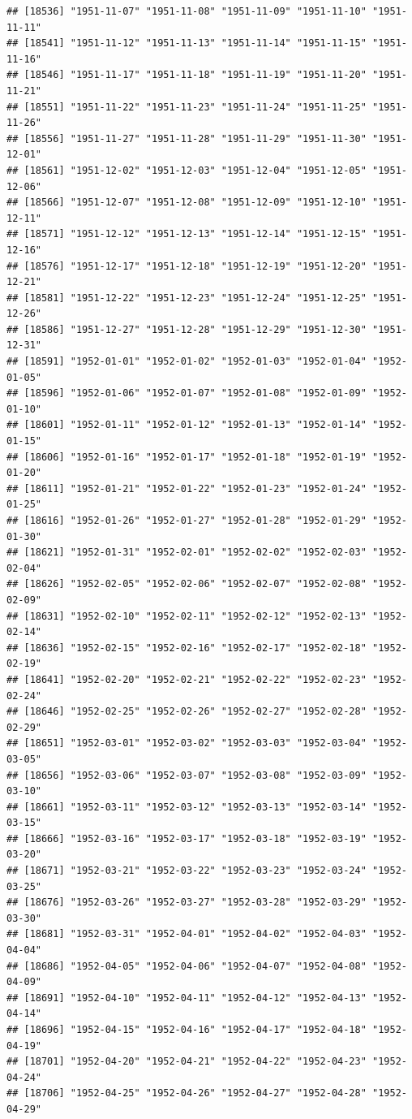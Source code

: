 \documentclass{article}\usepackage[]{graphicx}\usepackage[]{color}
\makeatletter
\newenvironment{kframe}{%
 \def\at@end@of@kframe{}%
 \ifinner\ifhmode%
  \def\at@end@of@kframe{\end{minipage}}%
  \begin{minipage}{\columnwidth}%
 \fi\fi%
 \def\FrameCommand##1{\hskip\@totalleftmargin \hskip-\fboxsep
 \colorbox{shadecolor}{##1}\hskip-\fboxsep
     \hskip-\linewidth \hskip-\@totalleftmargin \hskip\columnwidth}%
 \MakeFramed {\advance\hsize-\width
   \@totalleftmargin\z@ \linewidth\hsize
   \@setminipage}}%
 {\par\unskip\endMakeFramed%
 \at@end@of@kframe}
\newenvironment{knitrout}{}{} %
\makeatother
\begin{document}
\begin{description}
\begin{knitrout}
\begin{kframe}
\begin{verbatim}
## [18536] "1951-11-07" "1951-11-08" "1951-11-09" "1951-11-10" "1951-11-11"
## [18541] "1951-11-12" "1951-11-13" "1951-11-14" "1951-11-15" "1951-11-16"
## [18546] "1951-11-17" "1951-11-18" "1951-11-19" "1951-11-20" "1951-11-21"
## [18551] "1951-11-22" "1951-11-23" "1951-11-24" "1951-11-25" "1951-11-26"
## [18556] "1951-11-27" "1951-11-28" "1951-11-29" "1951-11-30" "1951-12-01"
## [18561] "1951-12-02" "1951-12-03" "1951-12-04" "1951-12-05" "1951-12-06"
## [18566] "1951-12-07" "1951-12-08" "1951-12-09" "1951-12-10" "1951-12-11"
## [18571] "1951-12-12" "1951-12-13" "1951-12-14" "1951-12-15" "1951-12-16"
## [18576] "1951-12-17" "1951-12-18" "1951-12-19" "1951-12-20" "1951-12-21"
## [18581] "1951-12-22" "1951-12-23" "1951-12-24" "1951-12-25" "1951-12-26"
## [18586] "1951-12-27" "1951-12-28" "1951-12-29" "1951-12-30" "1951-12-31"
## [18591] "1952-01-01" "1952-01-02" "1952-01-03" "1952-01-04" "1952-01-05"
## [18596] "1952-01-06" "1952-01-07" "1952-01-08" "1952-01-09" "1952-01-10"
## [18601] "1952-01-11" "1952-01-12" "1952-01-13" "1952-01-14" "1952-01-15"
## [18606] "1952-01-16" "1952-01-17" "1952-01-18" "1952-01-19" "1952-01-20"
## [18611] "1952-01-21" "1952-01-22" "1952-01-23" "1952-01-24" "1952-01-25"
## [18616] "1952-01-26" "1952-01-27" "1952-01-28" "1952-01-29" "1952-01-30"
## [18621] "1952-01-31" "1952-02-01" "1952-02-02" "1952-02-03" "1952-02-04"
## [18626] "1952-02-05" "1952-02-06" "1952-02-07" "1952-02-08" "1952-02-09"
## [18631] "1952-02-10" "1952-02-11" "1952-02-12" "1952-02-13" "1952-02-14"
## [18636] "1952-02-15" "1952-02-16" "1952-02-17" "1952-02-18" "1952-02-19"
## [18641] "1952-02-20" "1952-02-21" "1952-02-22" "1952-02-23" "1952-02-24"
## [18646] "1952-02-25" "1952-02-26" "1952-02-27" "1952-02-28" "1952-02-29"
## [18651] "1952-03-01" "1952-03-02" "1952-03-03" "1952-03-04" "1952-03-05"
## [18656] "1952-03-06" "1952-03-07" "1952-03-08" "1952-03-09" "1952-03-10"
## [18661] "1952-03-11" "1952-03-12" "1952-03-13" "1952-03-14" "1952-03-15"
## [18666] "1952-03-16" "1952-03-17" "1952-03-18" "1952-03-19" "1952-03-20"
## [18671] "1952-03-21" "1952-03-22" "1952-03-23" "1952-03-24" "1952-03-25"
## [18676] "1952-03-26" "1952-03-27" "1952-03-28" "1952-03-29" "1952-03-30"
## [18681] "1952-03-31" "1952-04-01" "1952-04-02" "1952-04-03" "1952-04-04"
## [18686] "1952-04-05" "1952-04-06" "1952-04-07" "1952-04-08" "1952-04-09"
## [18691] "1952-04-10" "1952-04-11" "1952-04-12" "1952-04-13" "1952-04-14"
## [18696] "1952-04-15" "1952-04-16" "1952-04-17" "1952-04-18" "1952-04-19"
## [18701] "1952-04-20" "1952-04-21" "1952-04-22" "1952-04-23" "1952-04-24"
## [18706] "1952-04-25" "1952-04-26" "1952-04-27" "1952-04-28" "1952-04-29"

\end{verbatim}
\end{kframe}
\end{knitrout}
\end{description}
\end{document}
